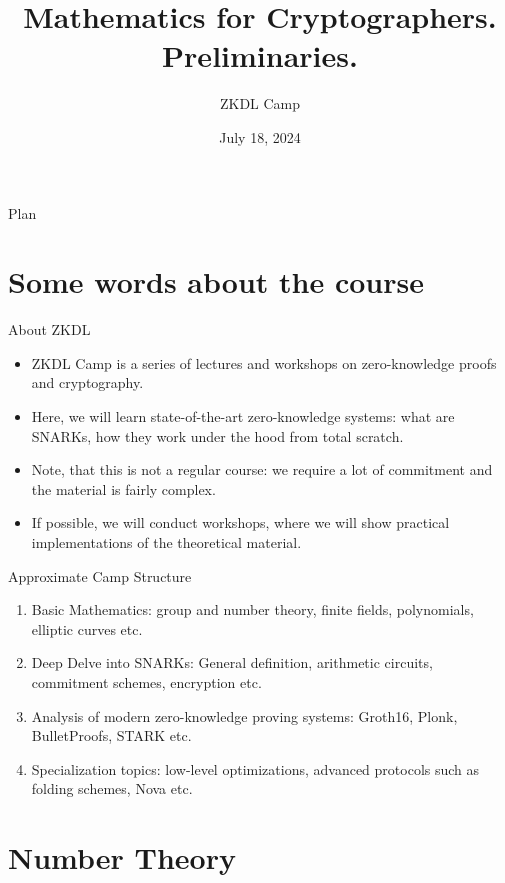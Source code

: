 \documentclass{beamer}
\title[Mathematics I]{\textbf{Mathematics for Cryptographers. Preliminaries.}}
\author{ZKDL Camp}
\date{July 18, 2024}
\begin{document}
    \frame {
      \titlepage
    }
  
    \begin{frame}{Plan}
      \tableofcontents
    \end{frame}

    \section{Some words about the course}
    \begin{frame}{About ZKDL} 

      \begin{itemize}
        \item ZKDL Camp is a series of lectures and workshops on zero-knowledge proofs and cryptography.
        \item Here, we will learn state-of-the-art zero-knowledge systems: what are SNARKs, how they work under the hood from total scratch.
        \item Note, that this is not a regular course: we require a lot of commitment and the material is fairly complex.
        \item If possible, we will conduct workshops, where we will show practical implementations of the theoretical material.
      \end{itemize}

    \end{frame}

    \begin{frame}{Approximate Camp Structure}
      \begin{enumerate}
        \item Basic Mathematics: group and number theory, finite fields, polynomials, elliptic curves etc.
        \item Deep Delve into SNARKs: General definition, arithmetic circuits, commitment schemes, encryption etc.
        \item Analysis of modern zero-knowledge proving systems: Groth16, Plonk, BulletProofs, STARK etc.
        \item Specialization topics: low-level optimizations, advanced protocols such as folding schemes, Nova etc.
      \end{enumerate}
    \end{frame}

    \section{Number Theory}
\end{document}
